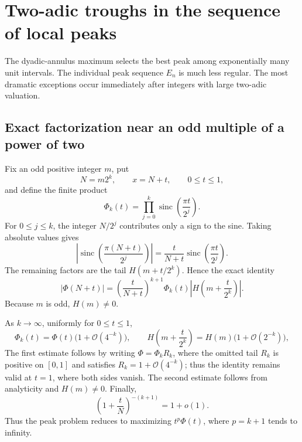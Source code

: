 \documentclass[11pt,oneside]{article}
\theoremstyle{definition}
\theoremstyle{remark}
\newcommand{\sinc}{\operatorname{sinc}}
\newcommand{\bigO}{\mathcal O}
\newcommand{\smallo}{o}
\newcommand{\PhiF}{\Phi}
\begin{document}
\section{Two-adic troughs in the sequence of local peaks}
\label{sec:two-adic-troughs}

The dyadic-annulus maximum selects the best peak among exponentially many
unit intervals.  The individual peak sequence \(E_n\) is much less regular.
The most dramatic exceptions occur immediately after integers with large
two-adic valuation.

\subsection{Exact factorization near an odd multiple of a power of two}

Fix an odd positive integer \(m\), put
\[
 N=m2^k,
 \qquad x=N+t,
 \qquad 0\le t\le1,
\]
and define the finite product
\begin{equation}
 \PhiF_k(t)=\prod_{j=0}^{k}
 \sinc\!\left(\frac{\pi t}{2^j}\right).
 \label{eq:Phi-k-finite}
\end{equation}
For \(0\le j\le k\), the integer \(N/2^j\) contributes only a sign to the
sine.  Taking absolute values gives
\[
 \left|
 \sinc\!\left(\frac{\pi(N+t)}{2^j}\right)
 \right|
 =\frac{t}{N+t}
 \sinc\!\left(\frac{\pi t}{2^j}\right).
\]
The remaining factors are the tail \(H(m+t/2^k)\).  Hence the exact identity
\begin{equation}
 |\PhiF(N+t)|
 =\left(\frac{t}{N+t}\right)^{k+1}
 \PhiF_k(t)
 \left|H\!\left(m+\frac{t}{2^k}\right)\right|.
 \label{eq:near-m2k-factorization}
\end{equation}
Because \(m\) is odd, \(H(m)\ne0\).

As \(k\to\infty\), uniformly for \(0\le t\le1\),
\begin{equation}
 \PhiF_k(t)=\PhiF(t)\bigl(1+\bigO(4^{-k})\bigr),
 \qquad
 H\!\left(m+\frac{t}{2^k}\right)
 =H(m)\bigl(1+\bigO(2^{-k})\bigr),
 \label{eq:uniform-tail-approximations}
\end{equation}
The first estimate follows by writing \(\PhiF=\PhiF_k R_k\), where the
omitted tail \(R_k\) is positive on \([0,1]\) and satisfies
\(R_k=1+\bigO(4^{-k})\); thus the identity remains valid at \(t=1\), where
both sides vanish.  The second estimate follows from analyticity and
\(H(m)\ne0\).  Finally,
\begin{equation}
 \left(1+\frac{t}{N}\right)^{-(k+1)}=1+\smallo(1).
 \label{eq:N-denominator-uniform}
\end{equation}
Thus the peak problem reduces to maximizing \(t^p\PhiF(t)\), where
\(p=k+1\) tends to infinity.
\end{document}
